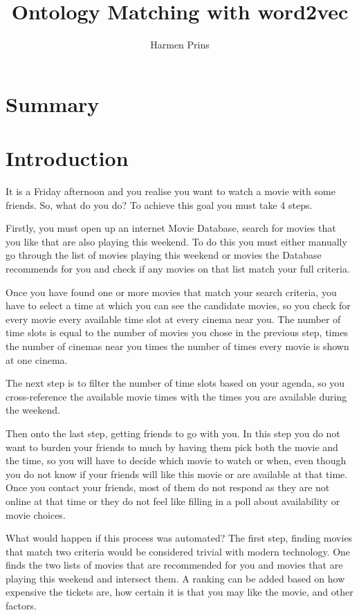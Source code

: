 \documentclass{article}
\title{Ontology Matching with word2vec}
\author{Harmen Prins}
\begin{document}
 \maketitle
 \newpage
 
 \section*{Summary}
 
 \tableofcontents
 
 \section{Introduction}
 It is a Friday afternoon and you realise you want to watch a movie with some friends. So, what do you do? To achieve this goal you must take 4 steps.
 
 Firstly, you must open up an internet Movie Database, search for movies that you like that are also playing this weekend. To do this you must either manually go through the list of movies playing this weekend or movies the Database recommends for you and check if any movies on that list match your full criteria.
 
 Once you have found one or more movies that match your search criteria, you have to select a time at which you can see the candidate movies, so you check for every movie every available time slot at every cinema near you. The number of time slots is equal to the number of movies you chose in the previous step, times the number of cinemas near you times the number of times every movie is shown at one cinema.
 
 The next step is to filter the number of time slots based on your agenda, so you cross-reference the available movie times with the times you are available during the weekend.
 
 Then onto the last step, getting friends to go with you. In this step you do not want to burden your friends to much by having them pick both the movie and the time, so you will have to decide which movie to watch or when, even though you do not know if your friends will like this movie or are available at that time. Once you contact your friends, most of them do not respond as they are not online at that time or they do not feel like filling in a poll about availability or movie choices.
 
 What would happen if this process was automated? The first step, finding movies that match two criteria would be considered trivial with modern technology. One finds the two lists of movies that are recommended for you and movies that are playing this weekend and intersect them. A ranking can be added based on how expensive the tickets are, how certain it is that you may like the movie, and other factors.
 
\end{document}
